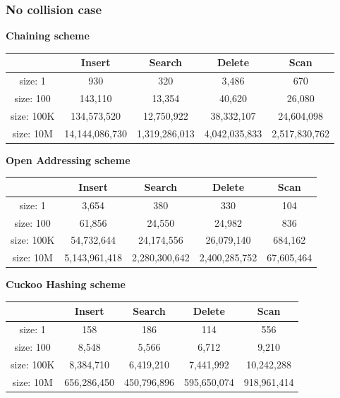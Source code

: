 \documentclass{article} %
\begin{document}
    \subsubsection*{No collision case}
    \textbf{Chaining scheme}
    \begin{center}
        \begin{tabular}{|c|c|c|c|c|}\hline
        & Insert & Search & Delete & Scan\\\hline
        size: 1 & 930 & 320 & 3,486 & 670\\\hline
        size: 100 & 143,110 & 13,354 & 40,620 & 26,080\\\hline
        size: 100K & 134,573,520 & 12,750,922 & 38,332,107 & 24,604,098\\\hline
        size: 10M & 14,144,086,730 & 1,319,286,013 & 4,042,035,833 & 2,517,830,762\\\hline
        \end{tabular}
    \end{center}

    \textbf{Open Addressing scheme}
    \begin{center}
        \begin{tabular}{|c|c|c|c|c|}\hline
        & Insert & Search & Delete & Scan\\\hline
        size: 1 & 3,654 & 380 & 330 & 104\\\hline
        size: 100 & 61,856 & 24,550 & 24,982 & 836\\\hline
        size: 100K & 54,732,644 & 24,174,556 & 26,079,140 & 684,162\\\hline
        size: 10M & 5,143,961,418 & 2,280,300,642 & 2,400,285,752 & 67,605,464\\\hline
        \end{tabular}
    \end{center}


    \textbf{Cuckoo Hashing scheme}
    \begin{center}
        \begin{tabular}{|c|c|c|c|c|}\hline
        & Insert & Search & Delete & Scan\\\hline
        size: 1 & 158 & 186 & 114 & 556\\\hline
        size: 100 & 8,548 & 5,566 & 6,712 & 9,210\\\hline
        size: 100K & 8,384,710 & 6,419,210 & 7,441,992 & 10,242,288\\\hline
        size: 10M & 656,286,450 & 450,796,896 & 595,650,074 & 918,961,414\\\hline
        \end{tabular}
    \end{center}
\end{document}

